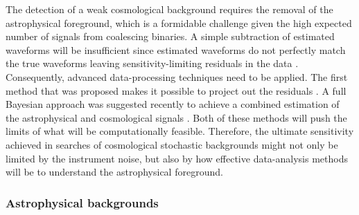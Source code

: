 The detection of a weak cosmological background requires the removal of the astrophysical foreground, which is a formidable challenge given the high expected number of signals from coalescing binaries. A simple subtraction of estimated waveforms will be insufficient since estimated waveforms do not perfectly match the true waveforms leaving sensitivity-limiting residuals in the data \cite{Regimbau:2017}. Consequently, advanced data-processing techniques need to be applied. The first method that was proposed makes it possible to project out the residuals \cite{Harms:2006}. A full Bayesian approach was suggested recently to achieve a combined estimation of the astrophysical and cosmological signals \cite{Smith:2018}. Both of these methods will push the limits of what will be computationally feasible. Therefore, the ultimate sensitivity achieved in searches of cosmological stochastic backgrounds might not only be limited by the instrument noise, but also by how effective data-analysis methods will be to understand the astrophysical foreground.

      
\subsubsection{Astrophysical backgrounds} 



